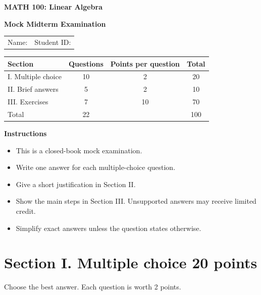 \documentclass[11pt]{article}
\newif\ifshowsolutions
\begin{document}
\begin{center}
  {\LARGE\bfseries MATH 100: Linear Algebra}\par
  \vspace{0.25em}
  {\Large\bfseries Mock Midterm Examination}\par
  \vspace{0.6em}
  \ifshowsolutions
    {\large\color{solutionblue}\bfseries Instructor solution version}\par
  \fi
\end{center}

\noindent
\begin{tabular}{@{}p{.47\linewidth}p{.47\linewidth}@{}}
Name: \hrulefill & Student ID: \hrulefill \\
\end{tabular}

\vspace{0.8em}
\noindent
\begin{tabular}{@{}lccc@{}}
\toprule
Section & Questions & Points per question & Total \\
\midrule
I. Multiple choice & 10 & 2 & 20 \\
II. Brief answers & 5 & 2 & 10 \\
III. Exercises & 7 & 10 & 70 \\
\midrule
Total & 22 & & 100 \\
\bottomrule
\end{tabular}

\vspace{0.8em}
\noindent\textbf{Instructions}
\begin{itemize}[leftmargin=1.5em,itemsep=0.25em,topsep=0.35em]
  \item This is a closed-book mock examination.
  \item Write one answer for each multiple-choice question.
  \item Give a short justification in Section II.
  \item Show the main steps in Section III. Unsupported answers may receive limited credit.
  \item Simplify exact answers unless the question states otherwise.
\end{itemize}

\section*{Section I. Multiple choice \hfill 20 points}

Choose the best answer. Each question is worth 2 points.
\end{document}
